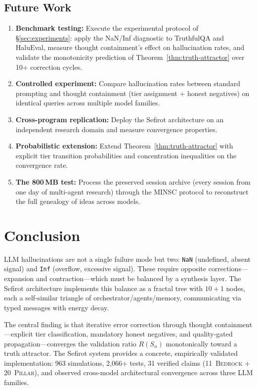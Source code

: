 \documentclass[11pt]{article}
\theoremstyle{definition}
\theoremstyle{remark}
\newcommand{\NaN}{\texttt{NaN}}
\newcommand{\Inf}{\texttt{Inf}}
\newcommand{\BEDROCK}{\textsc{Bedrock}}
\newcommand{\PILLAR}{\textsc{Pillar}}
\begin{document}
\subsection{Future Work}
\label{sec:future-work}

\begin{enumerate}
  \item \textbf{Benchmark testing:}  Execute the experimental protocol of
    \S\ref{sec:experiments}: apply the NaN/Inf diagnostic to TruthfulQA and
    HaluEval, measure thought containment's effect on hallucination rates, and
    validate the monotonicity prediction of Theorem~\ref{thm:truth-attractor}
    over 10+ correction cycles.
  \item \textbf{Controlled experiment:}  Compare hallucination rates between
    standard prompting and thought containment (tier assignment + honest
    negatives) on identical queries across multiple model families.
  \item \textbf{Cross-program replication:}  Deploy the Sefirot architecture on
    an independent research domain and measure convergence properties.
  \item \textbf{Probabilistic extension:}  Extend
    Theorem~\ref{thm:truth-attractor} with explicit tier transition
    probabilities and concentration inequalities on the convergence rate.
  \item \textbf{The 800\,MB test:}  Process the preserved session archive (every
    session from one day of multi-agent research) through the MINSC protocol to
    reconstruct the full genealogy of ideas across models.
\end{enumerate}

\section{Conclusion}
\label{sec:conclusion}

LLM hallucinations are not a single failure mode but two: \NaN{} (undefined,
absent signal) and \Inf{} (overflow, excessive signal).  These require opposite
corrections---expansion and contraction---which must be balanced by a synthesis
layer.  The Sefirot architecture implements this balance as a fractal tree with
$10 + 1$ nodes, each a self-similar triangle of orchestrator/agents/memory,
communicating via typed messages with energy decay.

The central finding is that iterative error correction through thought
containment---explicit tier classification, mandatory honest negatives, and
quality-gated propagation---converges the validation ratio $R(S_n)$ monotonically
toward a truth attractor.  The Sefirot system provides a concrete, empirically
validated implementation: 963 simulations, 2,066+ tests, 31 verified claims
(11~\BEDROCK{} + 20~\PILLAR{}), and observed cross-model architectural
convergence across three LLM families.
\end{document}
